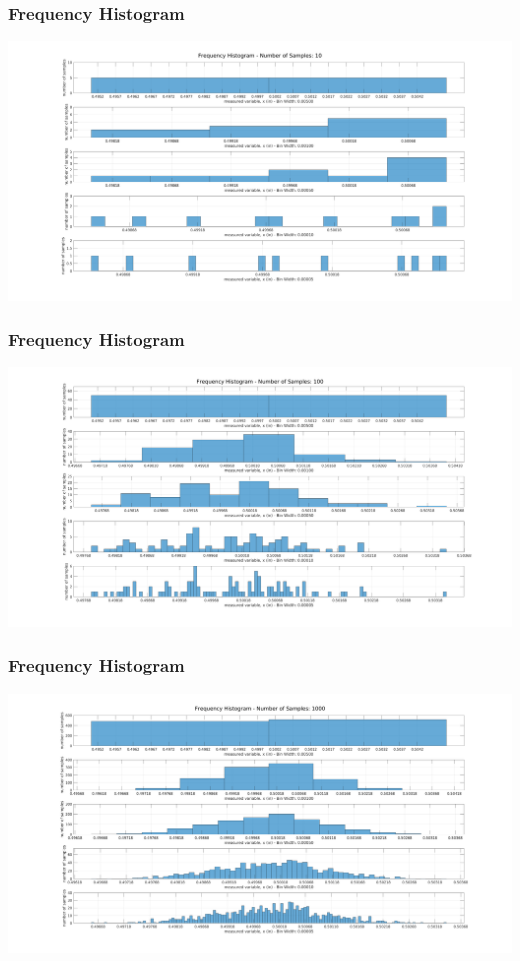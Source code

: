 \documentclass[fleqn]{beamer} %
\newcommand{\sectiontitleIII}{Frequency Histogram}
\begin{document}
	\begin{frame} \small
		\frametitle{\sectiontitleIII}    

	\includegraphics[scale=.25]{topic2_histogram_fig1}


	\end{frame}
	
	\begin{frame} \small
		\frametitle{\sectiontitleIII}    

	\includegraphics[scale=.25]{topic2_histogram_fig2}


	\end{frame}
	
	\begin{frame} \small
		\frametitle{\sectiontitleIII}    

	\includegraphics[scale=.25]{topic2_histogram_fig3}


	\end{frame}
	
\end{document}
